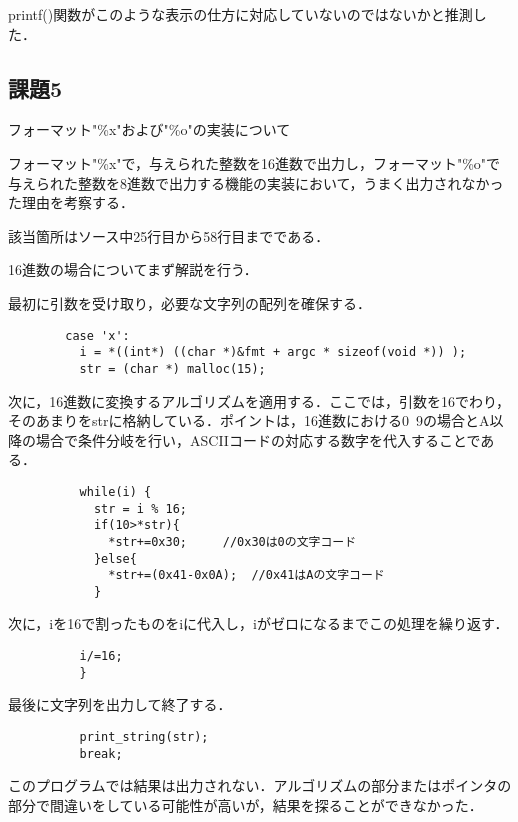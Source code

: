 \documentclass[a4j]{jarticle}
\begin{document}
printf()関数がこのような表示の仕方に対応していないのではないかと推測した．


\subsection{課題5}


フォーマット"\%x"および"\%o"の実装について

フォーマット"\%x"で，与えられた整数を16進数で出力し，フォーマット"\%o"で与えられた整数を8進数で出力する機能の実装において，うまく出力されなかった理由を考察する．

該当箇所はソース中25行目から58行目までである．

16進数の場合についてまず解説を行う．

最初に引数を受け取り，必要な文字列の配列を確保する．

\begin{verbatim}
        case 'x':
          i = *((int*) ((char *)&fmt + argc * sizeof(void *)) );
          str = (char *) malloc(15);
\end{verbatim}

次に，16進数に変換するアルゴリズムを適用する．ここでは，引数を16でわり，そのあまりをstrに格納している．ポイントは，16進数における0~9の場合とA以降の場合で条件分岐を行い，ASCIIコードの対応する数字を代入することである．

\begin{verbatim}
          while(i) {
            str = i % 16;
            if(10>*str){
              *str+=0x30;     //0x30は0の文字コード
            }else{
              *str+=(0x41-0x0A);  //0x41はAの文字コード
            }
\end{verbatim}

次に，iを16で割ったものをiに代入し，iがゼロになるまでこの処理を繰り返す．

\begin{verbatim}
          i/=16;
          }
\end{verbatim}

最後に文字列を出力して終了する．

\begin{verbatim}
          print_string(str);
          break;
\end{verbatim}

このプログラムでは結果は出力されない．アルゴリズムの部分またはポインタの部分で間違いをしている可能性が高いが，結果を探ることができなかった．



\newpage
\end{document}
